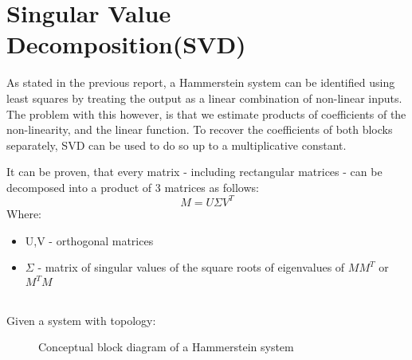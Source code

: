\chapter{Singular Value Decomposition(SVD)}
As stated in the previous report, a Hammerstein system can be identified
using least squares by treating the output as a linear combination of 
non-linear inputs. The problem with this however, is that we estimate
products of coefficients of the non-linearity, and the linear function.
To recover the coefficients of both blocks separately, SVD can be used to
do so up to a multiplicative constant.\\
{
    It can be proven, that every matrix - including rectangular matrices - can be decomposed into a product of 3 matrices as follows:
    \begin{equation}
        M = U\Sigma V^{T}
    \end{equation}
    Where:
    \begin{itemize}
        \item U,V - orthogonal matrices
        \item $\Sigma$ - matrix of singular values of the square roots of eigenvalues of  $MM^{T}$ or $M^{T}M$
    \end{itemize}

}
\\
Given a system with topology:
\begin{figure}[h!]
    \begin{center}
\caption{Conceptual block diagram of a Hammerstein system}
\label{}
\end{center}
\end{figure}



